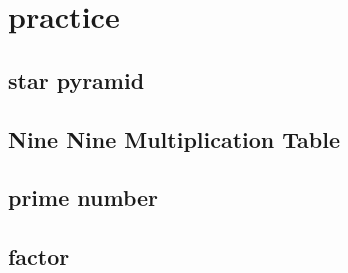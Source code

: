 \section{practice}
    \subsection{star pyramid}
            
    \subsection{Nine Nine Multiplication Table}
        
    \subsection{prime number}
        
    \subsection{factor}
        